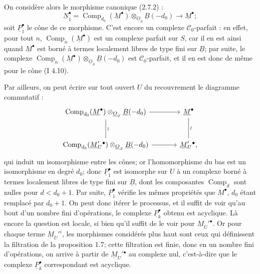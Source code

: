 
On
considère alors le morphisme canonique (2.7.2) :
\[
  \underline{N}_1^{\bullet}=\operatorname{Comp}_{d_0}(\underline{M}^{\bullet})\otimes_{\underline{O}_S}\underline{B}(-d_0)
  \longrightarrow \underline{M}^{\bullet};
\]
soit $\underline{P}_1^{\bullet}$ le cône de ce morphisme. C'est encore un complexe $\mathcal C_0$-parfait : en effet, pour tout $n$, $\operatorname{Comp}_n(\underline{M}^{\bullet})$ est un complexe parfait sur $S$, car il en est ainsi quand $\underline{M}^{\bullet}$ est borné à termes localement libres de type fini sur $\underline{B}$; par suite, le complexe $\operatorname{Comp}_n(\underline{M}^{\bullet})\otimes_{\underline{O}_S}\underline{B}(-d_0)$ est $\mathcal C_0$-parfait, et il en est donc de même pour le cône (I 4.10).

Par ailleurs, on peut écrire sur tout ouvert $U$ du recouvrement le diagramme commutatif :
\[
\begin{tikzcd}[column sep=large,row sep=large]
\operatorname{Comp}_{d_0}(\underline{M}^{\bullet})\otimes_{\underline{O}_S}\underline{B}(-d_0) \arrow[r] \arrow[d,dash,"\wr"] & \underline{M}^{\bullet} \arrow[d,dash,"\wr"]\\
\operatorname{Comp}_{d_0}(\underline{M}_U'{}^{\bullet})\otimes_{\underline{O}_S}\underline{B}(-d_0) \arrow[r] & \underline{M}_U'{}^{\bullet},
\end{tikzcd}
\]
qui induit un isomorphisme entre les cônes; or l'homomorphisme du bas est un isomorphisme en degré $d_0$; donc $\underline{P}_1^{\bullet}$ est isomorphe sur $U$ à un complexe borné à termes localement libres de type fini sur $\underline{B}$, dont les composantes $\operatorname{Comp}_d$ sont nulles pour $d<d_0+1$. Par suite, $\underline{P}_1^{\bullet}$ vérifie les mêmes propriétés que $\underline{M}^{\bullet}$, $d_0$ étant remplacé par $d_0+1$. On peut donc itérer le processus, et il suffit de voir qu'au bout d'un nombre fini d'opérations, le complexe $\underline{P}_k^{\bullet}$ obtenu est acyclique. Là encore la question est locale, si bien qu'il suffit de le voir pour $\underline{M}_U'{}^{\bullet}$. Or pour chaque terme $\underline{M}_U'{}^i$, les morphismes considérés plus haut sont ceux qui définissent la filtration de la proposition 1.7; cette filtration est finie, donc en un nombre fini d'opérations, on arrive à partir de $\underline{M}_U'{}^{\bullet}$ au complexe nul, c'est-à-dire que le complexe $\underline{P}_k^{\bullet}$ correspondant est acyclique.

